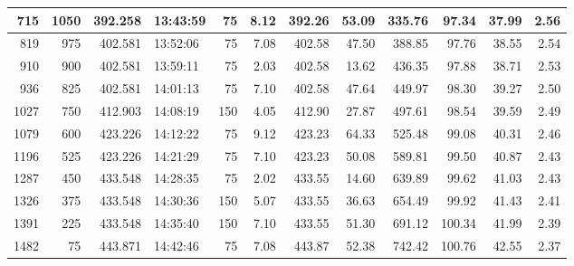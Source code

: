 \begin{table}[ht!]
\begin{adjustbox}{max width=\textwidth}
\begin{tabular}{|r|r|r|l|r|r|r|r|r|r|r|r|}
               715 &               1050 &         392.258 & 13:43:59 &               75 &       8.12 &         392.26 &      53.09 &     335.76 &        97.34 &       37.99 &      2.56 \\ \hline
               819 &                975 &         402.581 & 13:52:06 &               75 &       7.08 &         402.58 &      47.50 &     388.85 &        97.76 &       38.55 &      2.54 \\ \hline
               910 &                900 &         402.581 & 13:59:11 &               75 &       2.03 &         402.58 &      13.62 &     436.35 &        97.88 &       38.71 &      2.53 \\ \hline
               936 &                825 &         402.581 & 14:01:13 &               75 &       7.10 &         402.58 &      47.64 &     449.97 &        98.30 &       39.27 &      2.50 \\ \hline
              1027 &                750 &         412.903 & 14:08:19 &              150 &       4.05 &         412.90 &      27.87 &     497.61 &        98.54 &       39.59 &      2.49 \\ \hline
              1079 &                600 &         423.226 & 14:12:22 &               75 &       9.12 &         423.23 &      64.33 &     525.48 &        99.08 &       40.31 &      2.46 \\ \hline
              1196 &                525 &         423.226 & 14:21:29 &               75 &       7.10 &         423.23 &      50.08 &     589.81 &        99.50 &       40.87 &      2.43 \\ \hline
              1287 &                450 &         433.548 & 14:28:35 &               75 &       2.02 &         433.55 &      14.60 &     639.89 &        99.62 &       41.03 &      2.43 \\ \hline
              1326 &                375 &         433.548 & 14:30:36 &              150 &       5.07 &         433.55 &      36.63 &     654.49 &        99.92 &       41.43 &      2.41 \\ \hline
              1391 &                225 &         433.548 & 14:35:40 &              150 &       7.10 &         433.55 &      51.30 &     691.12 &       100.34 &       41.99 &      2.39 \\ \hline
              1482 &                 75 &         443.871 & 14:42:46 &               75 &       7.08 &         443.87 &      52.38 &     742.42 &       100.76 &       42.55 &      2.37 \\ \hline

\end{tabular}
\label{tab:cop_nov_table}
\end{adjustbox}
\end{table}

